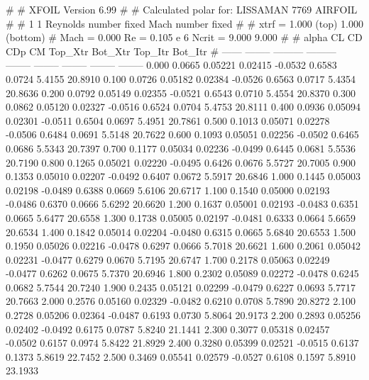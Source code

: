 #  
#       XFOIL         Version 6.99
#  
# Calculated polar for: LISSAMAN 7769 AIRFOIL                           
#  
# 1 1 Reynolds number fixed          Mach number fixed         
#  
# xtrf =   1.000 (top)        1.000 (bottom)  
# Mach =   0.000     Re =     0.105 e 6     Ncrit =   9.000  9.000
#  
#   alpha    CL        CD       CDp       CM     Top_Xtr  Bot_Xtr  Top_Itr  Bot_Itr
#  ------ -------- --------- --------- -------- -------- -------- -------- --------
   0.000   0.0665   0.05221   0.02415  -0.0532   0.6583   0.0724   5.4155  20.8910
   0.100   0.0726   0.05182   0.02384  -0.0526   0.6563   0.0717   5.4354  20.8636
   0.200   0.0792   0.05149   0.02355  -0.0521   0.6543   0.0710   5.4554  20.8370
   0.300   0.0862   0.05120   0.02327  -0.0516   0.6524   0.0704   5.4753  20.8111
   0.400   0.0936   0.05094   0.02301  -0.0511   0.6504   0.0697   5.4951  20.7861
   0.500   0.1013   0.05071   0.02278  -0.0506   0.6484   0.0691   5.5148  20.7622
   0.600   0.1093   0.05051   0.02256  -0.0502   0.6465   0.0686   5.5343  20.7397
   0.700   0.1177   0.05034   0.02236  -0.0499   0.6445   0.0681   5.5536  20.7190
   0.800   0.1265   0.05021   0.02220  -0.0495   0.6426   0.0676   5.5727  20.7005
   0.900   0.1353   0.05010   0.02207  -0.0492   0.6407   0.0672   5.5917  20.6846
   1.000   0.1445   0.05003   0.02198  -0.0489   0.6388   0.0669   5.6106  20.6717
   1.100   0.1540   0.05000   0.02193  -0.0486   0.6370   0.0666   5.6292  20.6620
   1.200   0.1637   0.05001   0.02193  -0.0483   0.6351   0.0665   5.6477  20.6558
   1.300   0.1738   0.05005   0.02197  -0.0481   0.6333   0.0664   5.6659  20.6534
   1.400   0.1842   0.05014   0.02204  -0.0480   0.6315   0.0665   5.6840  20.6553
   1.500   0.1950   0.05026   0.02216  -0.0478   0.6297   0.0666   5.7018  20.6621
   1.600   0.2061   0.05042   0.02231  -0.0477   0.6279   0.0670   5.7195  20.6747
   1.700   0.2178   0.05063   0.02249  -0.0477   0.6262   0.0675   5.7370  20.6946
   1.800   0.2302   0.05089   0.02272  -0.0478   0.6245   0.0682   5.7544  20.7240
   1.900   0.2435   0.05121   0.02299  -0.0479   0.6227   0.0693   5.7717  20.7663
   2.000   0.2576   0.05160   0.02329  -0.0482   0.6210   0.0708   5.7890  20.8272
   2.100   0.2728   0.05206   0.02364  -0.0487   0.6193   0.0730   5.8064  20.9173
   2.200   0.2893   0.05256   0.02402  -0.0492   0.6175   0.0787   5.8240  21.1441
   2.300   0.3077   0.05318   0.02457  -0.0502   0.6157   0.0974   5.8422  21.8929
   2.400   0.3280   0.05399   0.02521  -0.0515   0.6137   0.1373   5.8619  22.7452
   2.500   0.3469   0.05541   0.02579  -0.0527   0.6108   0.1597   5.8910  23.1933
